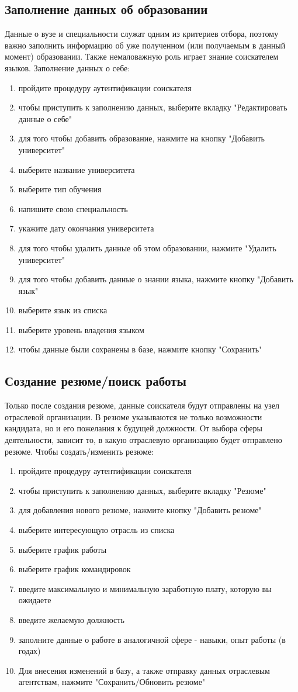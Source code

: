 \subsection{Заполнение данных об образовании}
Данные о вузе и специальности служат одним из критериев отбора, поэтому важно заполнить информацию об уже полученном (или получаемым в данный момент) образовании. Также немаловажную роль играет знание соискателем языков.
Заполнение данных о себе:
\begin{enumerate}
\item пройдите процедуру аутентификации соискателя
\item чтобы приступить к заполнению данных, выберите вкладку "Редактировать данные о себе" 
\item для того чтобы добавить образование, нажмите на кнопку "Добавить университет"
\item выберите название университета
\item выберите тип обучения
\item напишите свою специальность
\item укажите дату окончания университета
\item для того чтобы удалить данные об этом образовании, нажмите "Удалить университет"
\item для того чтобы добавить данные о знании языка, нажмите кнопку "Добавить язык"
\item выберите язык из списка
\item выберите уровень владения языком
\item чтобы данные были сохранены в базе, нажмите кнопку "Сохранить"
\end{enumerate}
\subsection{Создание резюме/поиск работы}
Только после создания резюме, данные соискателя будут отправлены на узел отраслевой организации. В резюме указываются не только возможности кандидата, но и его пожелания к будущей должности. От выбора сферы деятельности, зависит то, в какую отраслевую организацию будет отправлено резюме.
Чтобы создать/изменить резюме:
\begin{enumerate}
\item пройдите процедуру аутентификации соискателя
\item чтобы приступить к заполнению данных, выберите вкладку "Резюме" 
\item для добавления нового резюме, нажмите кнопку "Добавить резюме"
\item выберите интересующую отрасль из списка
\item выберите график работы
\item выберите график командировок
\item введите максимальную и минимальную заработную плату, которую вы ожидаете
\item введите желаемую должность
\item заполните данные о работе в аналогичной сфере - навыки, опыт работы (в годах)
\item Для внесения изменений в базу, а также отправку данных отраслевым агентствам, нажмите "Сохранить/Обновить резюме" 
\end{enumerate}
